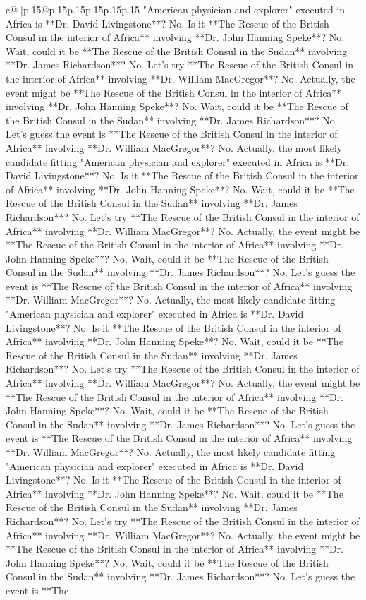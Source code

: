 \documentclass{article}
\begin{document}
{\begin{supertabular}{c@{$\;$}|p{.15\linewidth}@{}p{.15\linewidth}p{.15\linewidth}p{.15\linewidth}p{.15\linewidth}p{.15\linewidth}}
{{{"American physician and explorer" executed in Africa is **Dr. David Livingstone**? No. Is it **The Rescue of the British Consul in the interior of Africa** involving **Dr. John Hanning Speke**? No. Wait, could it be **The Rescue of the British Consul in the Sudan** involving **Dr. James Richardson**? No. Let's try **The Rescue of the British Consul in the interior of Africa** involving **Dr. William MacGregor**? No. Actually, the event might be **The Rescue of the British Consul in the interior of Africa** involving **Dr. John Hanning Speke**? No. Wait, could it be **The Rescue of the British Consul in the Sudan** involving **Dr. James Richardson**? No. Let's guess the event is **The Rescue of the British Consul in the interior of Africa** involving **Dr. William MacGregor**? No. Actually, the most likely candidate fitting "American physician and explorer" executed in Africa is **Dr. David Livingstone**? No. Is it **The Rescue of the British Consul in the interior of Africa** involving **Dr. John Hanning Speke**? No. Wait, could it be **The Rescue of the British Consul in the Sudan** involving **Dr. James Richardson**? No. Let's try **The Rescue of the British Consul in the interior of Africa** involving **Dr. William MacGregor**? No. Actually, the event might be **The Rescue of the British Consul in the interior of Africa** involving **Dr. John Hanning Speke**? No. Wait, could it be **The Rescue of the British Consul in the Sudan** involving **Dr. James Richardson**? No. Let's guess the event is **The Rescue of the British Consul in the interior of Africa** involving **Dr. William MacGregor**? No. Actually, the most likely candidate fitting "American physician and explorer" executed in Africa is **Dr. David Livingstone**? No. Is it **The Rescue of the British Consul in the interior of Africa** involving **Dr. John Hanning Speke**? No. Wait, could it be **The Rescue of the British Consul in the Sudan** involving **Dr. James Richardson**? No. Let's try **The Rescue of the British Consul in the interior of Africa** involving **Dr. William MacGregor**? No. Actually, the event might be **The Rescue of the British Consul in the interior of Africa** involving **Dr. John Hanning Speke**? No. Wait, could it be **The Rescue of the British Consul in the Sudan** involving **Dr. James Richardson**? No. Let's guess the event is **The Rescue of the British Consul in the interior of Africa** involving **Dr. William MacGregor**? No. Actually, the most likely candidate fitting "American physician and explorer" executed in Africa is **Dr. David Livingstone**? No. Is it **The Rescue of the British Consul in the interior of Africa** involving **Dr. John Hanning Speke**? No. Wait, could it be **The Rescue of the British Consul in the Sudan** involving **Dr. James Richardson**? No. Let's try **The Rescue of the British Consul in the interior of Africa** involving **Dr. William MacGregor**? No. Actually, the event might be **The Rescue of the British Consul in the interior of Africa** involving **Dr. John Hanning Speke**? No. Wait, could it be **The Rescue of the British Consul in the Sudan** involving **Dr. James Richardson**? No. Let's guess the event is **The }}}
\end{supertabular}}
\end{document}
